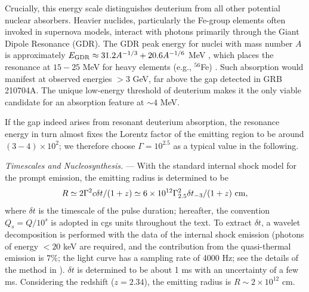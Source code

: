 \documentclass[prd,twocolumn,amsmath,amssymb,aps,linenumbers]{revtex4-2} %
\begin{document}
Crucially, this energy scale distinguishes deuterium from all other potential nuclear absorbers. Heavier nuclides, particularly the Fe-group elements often invoked in supernova models, interact with photons primarily through the Giant Dipole Resonance (GDR). The GDR peak energy for nuclei with mass number $A$ is approximately $E_{\rm GDR} \approx 31.2 A^{-1/3} + 20.6 A^{-1/6}$ MeV \cite{1975RvMP...47..713B}, which places the resonance at $15-25$ MeV for heavy elements (e.g., $^{56}$Fe) \cite{2020NuDS..163..109K}. Such absorption would manifest at observed energies $>3$ GeV, far above the gap detected in GRB 210704A. The unique low-energy threshold of deuterium makes it the only viable candidate for an absorption feature at $\sim 4$ MeV.

If the gap indeed arises from resonant deuterium absorption, the resonance energy in turn almost fixes the Lorentz factor of the emitting region to be around $(3-4)\times10^{2}$; we therefore choose $\Gamma = 10^{2.5}$ as a typical value in the following.

\textit{Timescales and Nucleosynthesis.} ---
With the standard internal shock model for the prompt emission, the emitting radius is determined to be~\citep{2011ApJ...726...90Z}
\begin{equation}\label{eq:Ris}
R \simeq 2 \Gamma^2 c \delta t/(1+z) \simeq 6 \times 10^{12} \Gamma_{2.5}^2 \delta t_{-3}/(1+z) \ {\rm cm},
\end{equation}
where $\delta t$ is the timescale of the pulse duration; hereafter, the convention $Q_s = Q/10^s$ is adopted in cgs units throughout the text. To extract $\delta t$, a wavelet decomposition is performed with the data of the internal shock emission (photons of energy $< 20$ keV are required, and the contribution from the quasi-thermal emission is $7\%$; the light curve has a sampling rate of 4000 Hz; see the details of the method in \citealt{2013MNRAS.432..857M}). $\delta t$ is determined to be about 1 ms with an uncertainty of a few ms. Considering the redshift ($z=2.34$), the emitting radius is $R \sim 2 \times 10^{12}$ cm.
\end{document}
